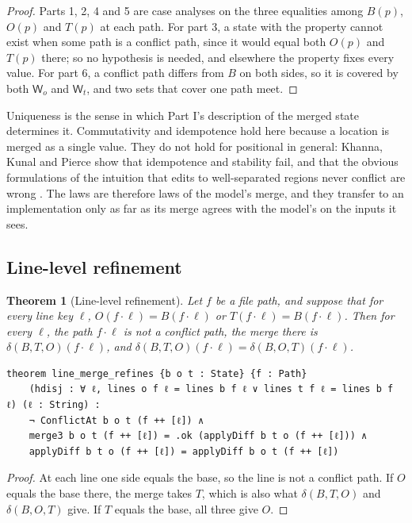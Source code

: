 \documentclass[11pt,letterpaper]{article}
\newtheorem{theorem}{Theorem}[section]
\theoremstyle{definition}
\theoremstyle{remark}
\newcommand{\W}{\mathsf{W}}
\begin{document}
\begin{proof}
Parts 1, 2, 4 and 5 are case analyses on the three equalities among $B(p)$, $O(p)$ and $T(p)$ at each path. For part 3, a state with the property cannot exist when some path is a conflict path, since it would equal both $O(p)$ and $T(p)$ there; so no hypothesis is needed, and elsewhere the property fixes every value. For part 6, a conflict path differs from $B$ on both sides, so it is covered by both $\W_o$ and $\W_t$, and two sets that cover one path meet.
\end{proof}

Uniqueness is the sense in which Part I's description of the merged state determines it. Commutativity and idempotence hold here because a location is merged as a single value. They do not hold for positional  in general: Khanna, Kunal and Pierce show that idempotence and stability fail, and that the obvious formulations of the intuition that edits to well-separated regions never conflict are wrong \cite{khanna2007diff3}. The laws are therefore laws of the model's merge, and they transfer to an implementation only as far as its merge agrees with the model's on the inputs it sees.

\subsection{Line-level refinement}

\begin{theorem}[Line-level refinement]
\label{thm:mcbl:lines}
Let $f$ be a file path, and suppose that for every line key $\ell$, $O(f\cdot\ell)=B(f\cdot\ell)$ or $T(f\cdot\ell)=B(f\cdot\ell)$. Then for every $\ell$, the path $f\cdot\ell$ is not a conflict path, the merge there is $\delta(B,T,O)(f\cdot\ell)$, and $\delta(B,T,O)(f\cdot\ell)=\delta(B,O,T)(f\cdot\ell)$.
\end{theorem}

\begin{lstlisting}[language=Lean,caption={Line-level refinement (\texttt{YonedaTx/Merge.lean})},label={lst:mcbl:linerefine}]
theorem line_merge_refines {b o t : State} {f : Path}
    (hdisj : ∀ ℓ, lines o f ℓ = lines b f ℓ ∨ lines t f ℓ = lines b f ℓ) (ℓ : String) :
    ¬ ConflictAt b o t (f ++ [ℓ]) ∧
    merge3 b o t (f ++ [ℓ]) = .ok (applyDiff b t o (f ++ [ℓ])) ∧
    applyDiff b t o (f ++ [ℓ]) = applyDiff b o t (f ++ [ℓ])
\end{lstlisting}

\begin{proof}
At each line one side equals the base, so the line is not a conflict path. If $O$ equals the base there, the merge takes $T$, which is also what $\delta(B,T,O)$ and $\delta(B,O,T)$ give. If $T$ equals the base, all three give $O$.
\end{proof}
\end{document}
